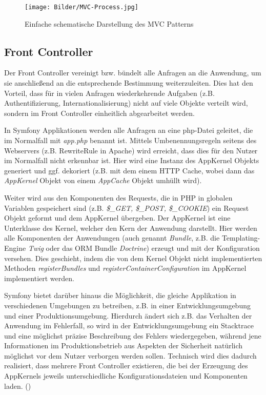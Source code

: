\documentclass[12pt]{report}
\begin{document}
\begin{figure}[htp]
\centering
\texttt{[image: Bilder/MVC-Process.jpg]}
\caption{Einfache schematische Darstellung des MVC Patterns}
\label{}
\end{figure}

\subsection{Front Controller}
Der Front Controller vereinigt bzw. bündelt alle Anfragen an die Anwendung, um sie anschließend an die entsprechende Bestimmung weiterzuleiten. Dies hat den Vorteil, dass für in vielen Anfragen wiederkehrende Aufgaben (z.B. Authentifizierung, Internationalisierung) nicht auf viele Objekte verteilt wird, sondern im Front Controller einheitlich abgearbeitet werden.
\cite{FrontController}

In Symfony Applikationen werden alle Anfragen an eine php-Datei geleitet, die im Normalfall mit \emph{app.php} benannt ist. Mittels Umbenennungsregeln seitens des Webservers (z.B. RewriteRule in Apache) wird erreicht, dass dies für den Nutzer im Normalfall nicht erkennbar ist. Hier wird eine Instanz des AppKernel Objekts generiert und ggf. dekoriert (z.B. mit dem einem HTTP Cache, wobei dann das \emph{AppKernel} Objekt von einem \emph{AppCache} Objekt umhüllt wird). 

Weiter wird aus den Komponenten des Requests, die in PHP in globalen Variablen gespeichert sind (z.B. \emph{\$\_GET, \$\_POST, \$\_COOKIE}) ein Request Objekt geformt und dem AppKernel übergeben. Der AppKernel ist eine Unterklasse des Kernel, welcher den Kern der Anwendung darstellt. Hier werden alle Komponenten der Anwendungen (auch genannt \emph{Bundle}, z.B. die Templating-Engine \emph{Twig} oder das ORM Bundle \emph{Doctrine}) erzeugt und mit der Konfiguration versehen. Dies geschieht, indem die von dem Kernel Objekt nicht implementierten Methoden \emph{registerBundles} und \emph{registerContainerConfiguration} im AppKernel implementiert werden.

Symfony bietet darüber hinaus die Möglichkeit, die gleiche Applikation in verschiedenen Umgebungen zu betreiben, z.B. in einer Entwicklungsumgebung und einer Produktionsumgebung. Hierdurch ändert sich z.B. das Verhalten der Anwendung im Fehlerfall, so wird in der Entwicklungsumgebung ein Stacktrace und eine möglichst präzise Beschreibung des Fehlers wiedergegeben, während jene Informationen im Produktionsbetrieb aus Aspekten der Sicherheit natürlich möglichst vor dem Nutzer verborgen werden sollen. Technisch wird dies dadurch realisiert, dass mehrere Front Controller existieren, die bei der Erzeugung des AppKernels jeweils unterschiedliche Konfigurationsdateien und Komponenten laden.
(\cite{sf2:FrontController})
\end{document}
